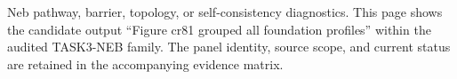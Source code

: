 Neb pathway, barrier, topology, or self-consistency diagnostics. This page shows the candidate output ``Figure cr81 grouped all foundation profiles'' within the audited TASK3-NEB family. The panel identity, source scope, and current status are retained in the accompanying evidence matrix.

